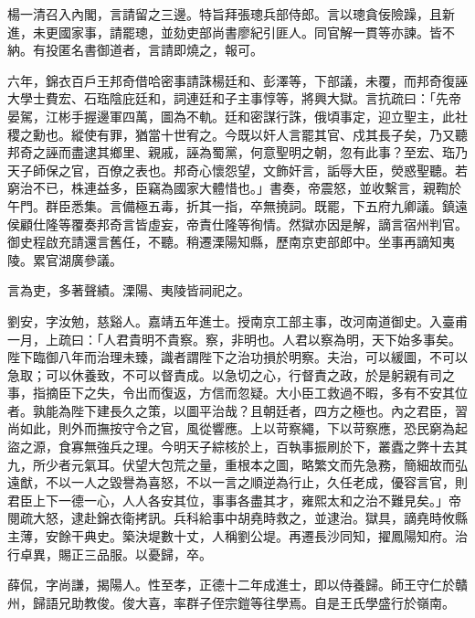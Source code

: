 \begin{pinyinscope}
{{楊一清召入內閣，言請留之三邊。特旨拜張璁兵部侍郎。言以璁貪佞險躁，且新進，未更國家事，請罷璁，並劾吏部尚書廖紀引匪人。同官解一貫等亦諫。皆不納。有投匿名書御道者，言請即燒之，報可。

六年，錦衣百戶王邦奇借哈密事請誅楊廷和、彭澤等，下部議，未覆，而邦奇復誣大學士費宏、石珤陰庇廷和，詞連廷和子主事惇等，將興大獄。言抗疏曰：「先帝晏駕，江彬手握邊軍四萬，圖為不軌。廷和密謀行誅，俄頃事定，迎立聖主，此社稷之勳也。縱使有罪，猶當十世宥之。今既以奸人言罷其官、戍其長子矣，乃又聽邦奇之誣而盡逮其鄉里、親戚，誣為蜀黨，何意聖明之朝，忽有此事？至宏、珤乃天子師保之官，百僚之表也。邦奇心懷怨望，文飾奸言，詬辱大臣，熒惑聖聽。若窮治不已，株連益多，臣竊為國家大體惜也。」書奏，帝震怒，並收繫言，親鞫於午門。群臣悉集。言備極五毒，折其一指，卒無撓詞。既罷，下五府九卿議。鎮遠侯顧仕隆等覆奏邦奇言皆虛妄，帝責仕隆等徇情。然獄亦因是解，謫言宿州判官。御史程啟充請還言舊任，不聽。稍遷溧陽知縣，歷南京吏部郎中。坐事再謫知夷陵。累官湖廣參議。

言為吏，多著聲績。溧陽、夷陵皆祠祀之。

劉安，字汝勉，慈谿人。嘉靖五年進士。授南京工部主事，改河南道御史。入臺甫一月，上疏曰：「人君貴明不貴察。察，非明也。人君以察為明，天下始多事矣。陛下臨御八年而治理未臻，識者謂陛下之治功損於明察。夫治，可以緩圖，不可以急取；可以休養致，不可以督責成。以急切之心，行督責之政，於是躬親有司之事，指摘臣下之失，令出而復返，方信而忽疑。大小臣工救過不暇，多有不安其位者。孰能為陛下建長久之策，以圖平治哉？且朝廷者，四方之極也。內之君臣，習尚如此，則外而撫按守令之官，風從響應。上以苛察繩，下以苛察應，恐民窮為起盜之源，食寡無強兵之理。今明天子綜核於上，百執事振刷於下，叢蠹之弊十去其九，所少者元氣耳。伏望大包荒之量，重根本之圖，略繁文而先急務，簡細故而弘遠猷，不以一人之毀譽為喜怒，不以一言之順逆為行止，久任老成，優容言官，則君臣上下一德一心，人人各安其位，事事各盡其才，雍熙太和之治不難見矣。」帝閱疏大怒，逮赴錦衣衛拷訊。兵科給事中胡堯時救之，並逮治。獄具，謫堯時攸縣主薄，安餘干典史。築決堤數十丈，人稱劉公堤。再遷長沙同知，擢鳳陽知府。治行卓異，賜正三品服。以憂歸，卒。

薛侃，字尚謙，揭陽人。性至孝，正德十二年成進士，即以侍養歸。師王守仁於贛州，歸語兄助教俊。俊大喜，率群子侄宗鎧等往學焉。自是王氏學盛行於嶺南。

}}
\end{pinyinscope}
